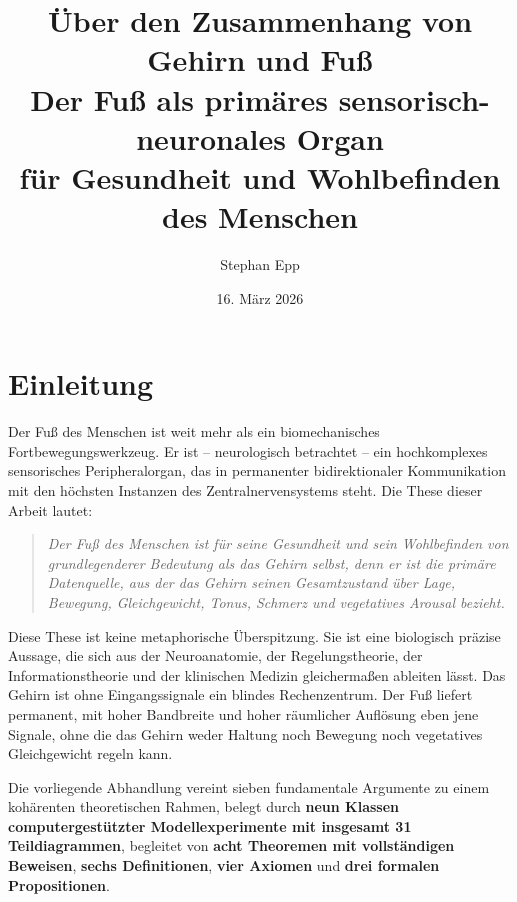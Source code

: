﻿\documentclass[12pt,a4paper]{report}
\title{\textbf{Über den Zusammenhang von Gehirn und Fuß}\\
Der Fuß als primäres sensorisch-neuronales Organ\\
für Gesundheit und Wohlbefinden des Menschen}
\author{Stephan Epp}
\date{16. März 2026}
\theoremstyle{plain}
\theoremstyle{definition}
\theoremstyle{remark}
\begin{document}
\maketitle
\tableofcontents
\newpage

\chapter{Einleitung}

Der Fuß des Menschen ist weit mehr als ein biomechanisches Fortbewegungswerkzeug.
Er ist -- neurologisch betrachtet -- ein hochkomplexes sensorisches Peripheralorgan,
das in permanenter bidirektionaler Kommunikation mit den höchsten Instanzen des
Zentralnervensystems steht. Die These dieser Arbeit lautet:

\begin{quote}
\textit{Der Fuß des Menschen ist für seine Gesundheit und sein Wohlbefinden
von grundlegenderer Bedeutung als das Gehirn selbst, denn er ist die primäre
Datenquelle, aus der das Gehirn seinen Gesamtzustand über Lage, Bewegung,
Gleichgewicht, Tonus, Schmerz und vegetatives Arousal bezieht.}
\end{quote}

Diese These ist keine metaphorische Überspitzung. Sie ist eine biologisch
präzise Aussage, die sich aus der Neuroanatomie, der Regelungstheorie,
der Informationstheorie und der klinischen Medizin gleichermaßen ableiten lässt.
Das Gehirn ist ohne Eingangssignale ein blindes Rechenzentrum. Der Fuß liefert
permanent, mit hoher Bandbreite und hoher räumlicher Auflösung eben jene
Signale, ohne die das Gehirn weder Haltung noch Bewegung noch vegetatives
Gleichgewicht regeln kann.

Die vorliegende Abhandlung vereint sieben fundamentale Argumente zu einem
kohärenten theoretischen Rahmen, belegt durch \textbf{neun Klassen
computergestützter Modellexperimente mit insgesamt 31 Teildiagrammen},
begleitet von \textbf{acht Theoremen mit vollständigen Beweisen},
\textbf{sechs Definitionen}, \textbf{vier Axiomen} und
\textbf{drei formalen Propositionen}.
\end{document}
